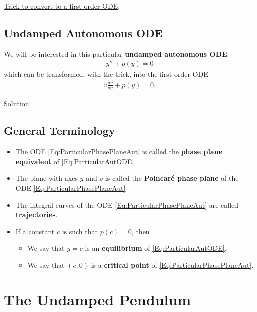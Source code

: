 \documentclass[12pt,a4paper]{article}
\begin{document}
\underline{Trick to convert to a first order ODE}:

\vfill

\subsection{Undamped Autonomous ODE}
We will be interested in this particular \textbf{undamped autonomous ODE}:
	\begin{align}
	y'' + p(y) = 0 \label{Eq:ParticularAutODE}
	\end{align}
which can be transformed, with the trick, into the first order ODE
	\begin{align}
	v \frac{dv}{dy} + p(y) = 0 \label{Eq:ParticularPhasePlaneAut}.
	\end{align}
	
\underline{Solution:}

\subsection{General Terminology}
\begin{itemize}
\item The ODE \eqref{Eq:ParticularPhasePlaneAut} is called the \textbf{phase plane equivalent} of \eqref{Eq:ParticularAutODE}.
\item The plane with axes $y$ and $v$ is called the \textbf{Poincaré phase plane} of the ODE \eqref{Eq:ParticularPhasePlaneAut}
\item The integral curves of the ODE \eqref{Eq:ParticularPhasePlaneAut} are called \textbf{trajectories}.
\item If a constant $c$ is such that $p(c) = 0$, then
	\begin{itemize}
	\item We say that $y = c$ is an \textbf{equilibrium} of \eqref{Eq:ParticularAutODE}.
	\item We say that $(c, 0)$ is a \textbf{critical point} of \eqref{Eq:ParticularPhasePlaneAut}.
	\end{itemize}
\end{itemize}

\newpage

\section{The Undamped Pendulum}
\end{document}
